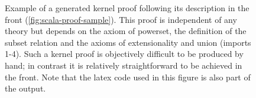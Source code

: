 

\begin{figure}[H]
  \centering
  
  \caption[Sample proof (kernel)]{Example of a generated kernel proof following its description in the front (\autoref{fig:scala-proof-sample}). This proof is independent of any theory but depends on the axiom of powerset, the definition of the subset relation and the axioms of extensionality and union (imports 1-4). Such a kernel proof is objectively difficult to be produced by hand; in contrast it is relatively straightforward to be achieved in the front. Note that the latex code used in this figure is also part of the output.}
  \label{fig:lisa-proof-sample}
\end{figure}
